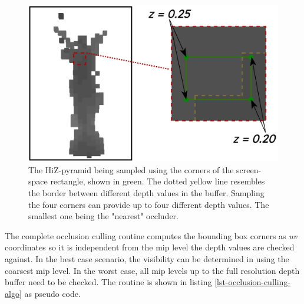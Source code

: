 \begin{figure}[h]
    \centering
    \includegraphics[width=\linewidth]{images/graphics/visibility-hiz-sampling.jpg}
    \caption{The \ac{HiZ}-pyramid being sampled using the corners of the screen-space rectangle, shown in green. 
    The dotted yellow line resembles the border between different depth values in the buffer. Sampling the four 
    corners can provide up to four different depth values. The smallest one being the "nearest" occluder.}
    \label{fig:visibility-hiz-sampling}
\end{figure}


\noindent
The complete occlusion culling routine computes the bounding box corners as \emph{uv} coordinates so it is independent 
from the mip level the depth values are checked against. In the best case scenario, the visibility can be determined in 
using the coarsest mip level. In the worst case, all mip levels up to the full resolution depth buffer need to be checked.
The routine is shown in listing \ref{lst-occlusion-culling-algo} as pseudo code.

